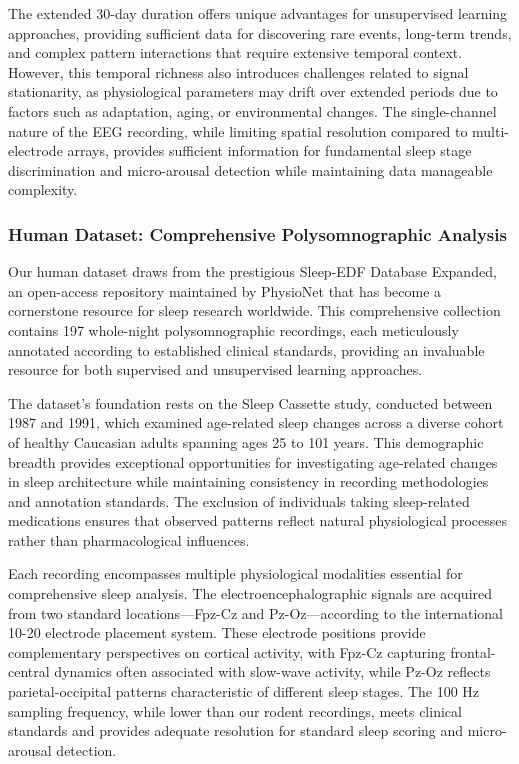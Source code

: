 \documentclass[a4paper,12pt,twoside]{article}
\begin{document}
The extended 30-day duration offers unique advantages for unsupervised learning approaches, providing sufficient data for discovering rare events, long-term trends, and complex pattern interactions that require extensive temporal context. However, this temporal richness also introduces challenges related to signal stationarity, as physiological parameters may drift over extended periods due to factors such as adaptation, aging, or environmental changes. The single-channel nature of the EEG recording, while limiting spatial resolution compared to multi-electrode arrays, provides sufficient information for fundamental sleep stage discrimination and micro-arousal detection while maintaining data manageable complexity.

\subsubsection{Human Dataset: Comprehensive Polysomnographic Analysis}

Our human dataset draws from the prestigious Sleep-EDF Database Expanded, an open-access repository maintained by PhysioNet that has become a cornerstone resource for sleep research worldwide. This comprehensive collection contains 197 whole-night polysomnographic recordings, each meticulously annotated according to established clinical standards, providing an invaluable resource for both supervised and unsupervised learning approaches.

The dataset's foundation rests on the Sleep Cassette study, conducted between 1987 and 1991, which examined age-related sleep changes across a diverse cohort of healthy Caucasian adults spanning ages 25 to 101 years. This demographic breadth provides exceptional opportunities for investigating age-related changes in sleep architecture while maintaining consistency in recording methodologies and annotation standards. The exclusion of individuals taking sleep-related medications ensures that observed patterns reflect natural physiological processes rather than pharmacological influences.

Each recording encompasses multiple physiological modalities essential for comprehensive sleep analysis. The electroencephalographic signals are acquired from two standard locations—Fpz-Cz and Pz-Oz—according to the international 10-20 electrode placement system. These electrode positions provide complementary perspectives on cortical activity, with Fpz-Cz capturing frontal-central dynamics often associated with slow-wave activity, while Pz-Oz reflects parietal-occipital patterns characteristic of different sleep stages. The 100 Hz sampling frequency, while lower than our rodent recordings, meets clinical standards and provides adequate resolution for standard sleep scoring and micro-arousal detection.
\end{document}
